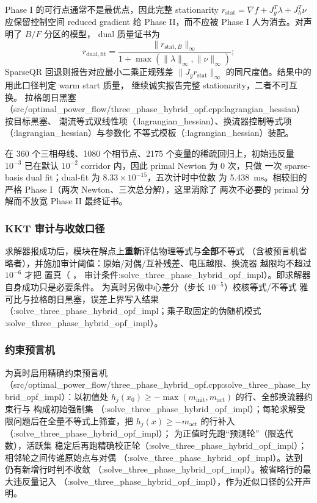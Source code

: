 Phase I 的可行点通常不是最优点，因此完整 stationarity
$r_{\mathrm{stat}}=\nabla f+J_g^T\lambda+J_h^T\nu$ 应保留控制空间 reduced
gradient 给 Phase II，而不应被 Phase I 人为消去。对声明了 $B/F$ 分区的模型，
dual 质量证书为
\begin{equation}
 r_{\mathrm{dual,fit}}=
 \frac{\|r_{\mathrm{stat},B}\|_\infty}
 {1+\max(\|\lambda\|_\infty,\|\nu\|_\infty)};
 \label{eq:phase-one-dual-fit}
\end{equation}
SparseQR 回退则报告对应最小二乘正规残差
$\|J_g r_{\mathrm{stat}}\|_\infty$ 的同尺度值。结果中的
 用此口径判定 warm start 质量，
 继续诚实报告完整 stationarity，二者不可互换。
拉格朗日黑塞 （src/optimal\_power\_flow/three\_phase\_hybrid\_opf.cpp:lagrangian\_hessian）按目标黑塞、
潮流等式双线性项（:lagrangian\_hessian）、换流器控制等式项（:lagrangian\_hessian）与参数化
不等式模板（:lagrangian\_hessian）装配。

在 360 个三相母线、1080 个相节点、2175 个变量的稀疏回归上，初始违反量
$10^{-3}$ 已在默认 $10^{-2}$ corridor 内，因此 primal Newton 为 0 次，只做
一次 sparse-basis dual fit；dual-fit 为 $8.33\times10^{-15}$，五次计时中位数
为 5.438~ms。相较旧的严格 Phase I（两次 Newton、三次总分解），这里消除了
两次不必要的 primal 分解而不放宽 Phase II 最终证书。

\subsubsection*{KKT 审计与收敛口径}
求解器报成功后，模块在解点上\textbf{重新}评估物理等式与\textbf{全部}不等式
（含被预言机省略者），并施加审计阈值：原始/对偶/互补残差、电压越限、换流器
越限均不超过 $10^{-6}$ 才把  置真（
，
审计条件:solve\_three\_phase\_hybrid\_opf\_impl）。即求解器自身成功只是必要条件。
 为真时另做中心差分（步长 $10^{-5}$）校核等式/不等式
雅可比与拉格朗日黑塞，误差上界写入结果（:solve\_three\_phase\_hybrid\_opf\_impl；乘子取固定的伪随机模式
:solve\_three\_phase\_hybrid\_opf\_impl）。

\subsubsection*{约束预言机}
 为真时启用精确约束预言机
（src/optimal\_power\_flow/three\_phase\_hybrid\_opf.cpp:solve\_three\_phase\_hybrid\_opf\_impl）：以初值处 $h_j(x_0)\ge -\max(m_{\mathrm{init}},m_{\mathrm{act}})$
的行、全部换流器约束行与  构成初始强制集
（:solve\_three\_phase\_hybrid\_opf\_impl）；每轮求解受限问题后在全量不等式上筛查，把
$h_j(x)\ge -m_{\mathrm{act}}$ 的行补入（:solve\_three\_phase\_hybrid\_opf\_impl）；
 为正值时先跑“预测轮”（限迭代数），活跃集
稳定后再跑精确校正轮（:solve\_three\_phase\_hybrid\_opf\_impl）；相邻轮之间传递原始点与对偶
（:solve\_three\_phase\_hybrid\_opf\_impl）。达到  仍有新增行时判不收敛
（:solve\_three\_phase\_hybrid\_opf\_impl）。被省略行的最大违反量记入 
（:solve\_three\_phase\_hybrid\_opf\_impl），作为近似口径的公开声明。

